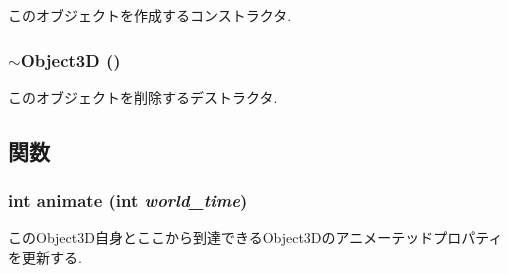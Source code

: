 このオブジェクトを作成するコンストラクタ. \hypertarget{classm3g_1_1Object3D_8ece10725587e63a2c75283c16cc4df5}{
\subsubsection[{$\sim$Object3D}]{\setlength{\rightskip}{0pt plus 5cm}$\sim${\bf Object3D} ()}}
\label{classm3g_1_1Object3D_8ece10725587e63a2c75283c16cc4df5}


このオブジェクトを削除するデストラクタ. 

\subsection{関数}
\hypertarget{classm3g_1_1Object3D_8aad1ceab4c2a03609c8a42324ce484d}{
\subsubsection[{animate}]{\setlength{\rightskip}{0pt plus 5cm}int animate (int {\em world\_\-time})}}
\label{classm3g_1_1Object3D_8aad1ceab4c2a03609c8a42324ce484d}


このObject3D自身とここから到達できるObject3Dのアニメーテッドプロパティを更新する. 

